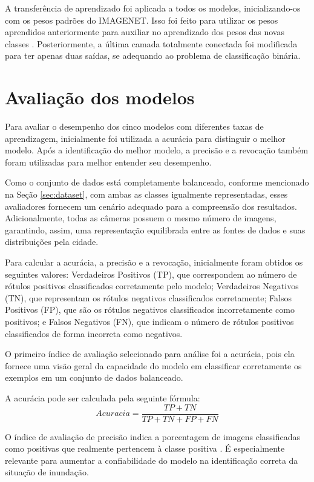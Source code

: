 A transferência de aprendizado foi aplicada a todos os modelos, inicializando-os com os pesos padrões do IMAGENET. Isso foi feito para utilizar os pesos aprendidos anteriormente para auxiliar no aprendizado dos pesos das novas classes \cite{kolesnikov2020big}. Posteriormente, a última camada totalmente conectada foi modificada para ter apenas duas saídas, se adequando ao problema de classificação binária.
\section{Avaliação dos modelos}

Para avaliar o desempenho dos cinco modelos com diferentes taxas de aprendizagem, inicialmente foi utilizada a acurácia para distinguir o melhor modelo.
Após a identificação do melhor modelo, a precisão e a revocação também foram utilizadas para melhor entender seu desempenho.

Como o conjunto de dados está completamente balanceado, conforme mencionado na Seção \ref{sec:dataset}, com ambas as classes igualmente representadas, esses avaliadores fornecem um cenário adequado para a compreensão dos resultados.
Adicionalmente, todas as câmeras possuem o mesmo número de imagens, garantindo, assim, uma representação equilibrada entre as fontes de dados e suas distribuições pela cidade.

Para calcular a acurácia, a precisão e a revocação, inicialmente foram obtidos os seguintes valores:
Verdadeiros Positivos (TP), que correspondem ao número de rótulos positivos classificados corretamente pelo modelo;
Verdadeiros Negativos (TN), que representam os rótulos negativos classificados corretamente;
Falsos Positivos (FP), que são os rótulos negativos classificados incorretamente como positivos;
e Falsos Negativos (FN), que indicam o número de rótulos positivos classificados de forma incorreta como negativos.

O primeiro índice de avaliação selecionado para análise foi a acurácia,
pois ela fornece uma visão geral da capacidade do modelo em classificar corretamente os exemplos em um conjunto de dados balanceado. 

A acurácia pode ser calculada pela seguinte fórmula:
\begin{equation}
    \label{eqn:accuracy}
    Acuracia = \frac{TP+TN}{TP+TN+FP+FN}
\end{equation}

O índice de avaliação de precisão indica a porcentagem de imagens classificadas como positivas que realmente pertencem à classe positiva \cite{FAWCETT2006861}. 
É especialmente relevante para aumentar a confiabilidade do modelo na identificação correta da situação de inundação.


